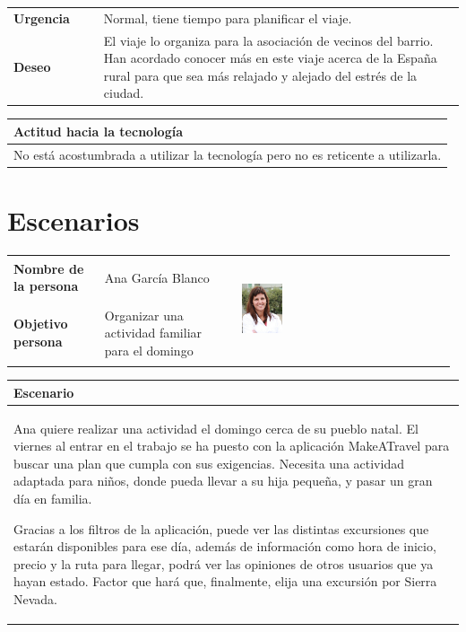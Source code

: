 \documentclass[11pt]{article}
\begin{document}
\begin{table}[H]
	\begin{tabular}{p{0.2\linewidth}|p{0.8\linewidth}}
		\toprule
		\textbf{Urgencia} & Normal, tiene tiempo para planificar el viaje.\\
		\textbf{Deseo}  & El viaje lo organiza para la asociación de vecinos del barrio. Han acordado conocer más en este viaje acerca de la España rural para que sea más relajado y alejado del estrés de la ciudad.\\
		\bottomrule
	\end{tabular}
	
	\begin{tabular}{p{1.028\linewidth}}
		\textbf{Actitud hacia la tecnología}\\
		\midrule
		No está acostumbrada a utilizar la tecnología pero no es reticente a utilizarla.
	\end{tabular}
\end{table}


\newpage
\section{Escenarios}

\begin{table}[H]
  \centering
  \begin{tabular}{p{0.2\linewidth}|p{0.3\linewidth}p{0.475\linewidth}}
    \toprule
    \textbf{Nombre de la persona} & Ana García Blanco &\multirow{2}{*}{\begin{minipage}{1.\textwidth}\includegraphics[width=0.2\textwidth, height=30mm]{Ana}\end{minipage}}\\
    \textbf{Objetivo persona} & Organizar una actividad familiar para el domingo & \\
    \bottomrule
  \end{tabular}

\begin{tabular}{p{1.028\linewidth}}
  \textbf{Escenario}\\
  \midrule  
  Ana quiere realizar una actividad el domingo cerca de su pueblo natal. El viernes al entrar en el trabajo se ha puesto con la aplicación MakeATravel para buscar una plan que cumpla con sus exigencias.
Necesita una actividad adaptada para niños, donde pueda llevar a su hija pequeña, y pasar un gran día en familia.

Gracias a los filtros de la aplicación, puede ver las distintas excursiones que estarán disponibles para ese día, además de información como hora de inicio, precio y la ruta para llegar, podrá ver las opiniones de otros usuarios que ya hayan estado. Factor que hará que, finalmente, elija una excursión por Sierra Nevada.

\end{tabular}
\end{table}
\end{document}

